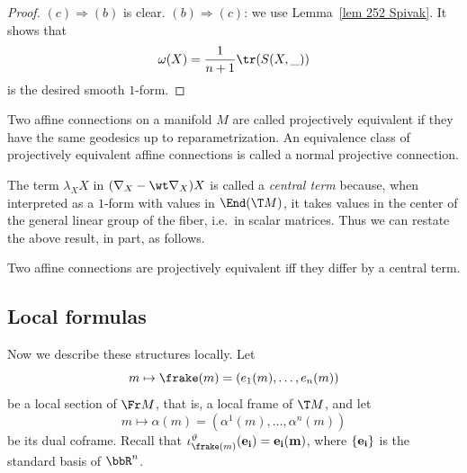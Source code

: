 \begin{proof}
    $(c)\Rightarrow (b)$ is clear. $(b)\Rightarrow(c)$: we use Lemma~\ref{lem 252 Spivak}. It shows that 
    \[\omega(X)=\frac{1}{n+1}\tr (S(X,\_))\]
    is the desired smooth $1$-form.
\end{proof}

\begin{defn}
    Two affine connections on a manifold $M$ are called projectively equivalent if they have the same geodesics up to reparametrization. An equivalence class of projectively equivalent affine connections is called a normal projective connection.
\end{defn}

The term $\lambda_X X$ in $(\nabla_X -\wt\nabla_X)X$ is called a \emph{central term} because, when interpreted as a $1$-form with values in $\End(\T M)$, it takes values in the center of the general linear group of the fiber, i.e.\ in scalar matrices. Thus we can restate the above result, in part, as follows.

\begin{cor}
    Two affine connections are projectively equivalent iff they differ by a central term.
\end{cor}







\subsection{Local formulas}


Now we describe these structures locally. Let
\[m\mapsto \frake(m)=(e_1(m),\ldots,e_n(m))\]
be a local section of $\Fr M$, that is, a local frame of $\T M$, and let 
\[m\mapsto \alpha(m)=(\alpha^1(m),\ldots,\alpha^n(m))\]
be its dual coframe. Recall that $\iota^\vartheta_{\frake(m)}(\bf{e}_i)=e_i(m)$, where $\{\bf{e}_i\}$ is the standard basis of $\bbR^n$.

